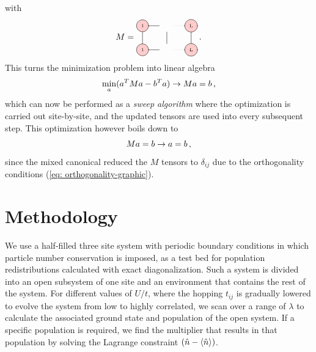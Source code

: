 \documentclass[twoside,twocolumn,9pt]{article}
\begin{document}
with
\begin{equation}
  M = \begin{tikzpicture}[baseline={([yshift=-.5ex]current bounding box.center)}]
    \draw[gray, thick] (0,0) -- (0,-1);
    \draw[gray, thick] (1,-0.25) -- (1,-0.75);
    \draw[gray, thick] (2,0) -- (2,-1);

    \draw[gray, thick] (0,0) -- (0.7,0);
    \draw[gray, dotted] (1.3,0) -- (1.7,0);
    \draw[gray, thick] (1.7,0) -- (2.0,0);

    \draw[gray, thick] (0,-1) -- (0.7,-1);
    \draw[gray, dotted] (1.3,-1) -- (1.7,-1);
    \draw[gray, thick] (1.7,-1) -- (2.0,-1);

    \node[draw, circle, line cap=round, fill=red!20] at (0,0) {\tiny 1};
    \node[draw, circle, line cap=round, fill=red!20] at (2,0) {\tiny L};

    \node[draw, circle, line cap=round, fill=red!20] at (0,-1) {\tiny 1};
    \node[draw, circle, line cap=round, fill=red!20] at (2,-1) {\tiny L};
  \end{tikzpicture} \thinspace .
\end{equation}
This turns the minimization problem into linear algebra
\begin{equation}
  \min_a(a^T M a - b^T a ) \rightarrow Ma = b \thinspace ,
\end{equation}
which can now be performed as a \emph{sweep algorithm} where the optimization is carried out site-by-site, and the updated tensors are used into every subsequent step. This optimization however boils down to 
\begin{equation}
  Ma = b \rightarrow a = b \thinspace ,
\end{equation}
since the mixed canonical reduced the $M$ tensors to $\delta_{ij}$ due to the orthogonality conditions (\cref{eq: orthogonality-graphic}). 

\section{Methodology}

We use a half-filled three site system with periodic boundary conditions in which particle number conservation is imposed, as a test bed for population redistributions calculated with exact diagonalization. Such a system is divided into an open subsystem of one site and an environment that contains the rest of the system. For different values ​​of $U/t$, where the hopping $t_{ij}$ is gradually lowered to evolve the system from low to highly correlated, we scan over a range of $\lambda$ to calculate the associated ground state and population of the open system. If a specific population is required, we find the multiplier that results in that population by solving the Lagrange constraint $(\hat{n} - \expval{\hat{n}})$.
\end{document}
